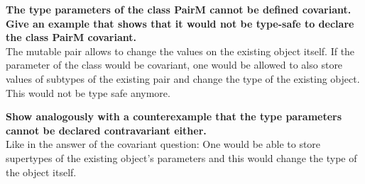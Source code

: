 \textbf{The type parameters of the class PairM cannot be defined covariant. Give an example that shows that it would not be type-safe to declare the class PairM covariant.} \\

The mutable pair allows to change the values on the existing object itself. If the parameter of the class would be covariant, one would be allowed to also store values of subtypes of the existing pair and change the type of the existing object. This would not be type safe anymore.

\textbf{Show analogously with a counterexample that the type parameters cannot be declared contravariant either.} \\

Like in the answer of the covariant question: One would be able to store supertypes of the existing object's parameters and this would change the type of the object itself.

\clearpage